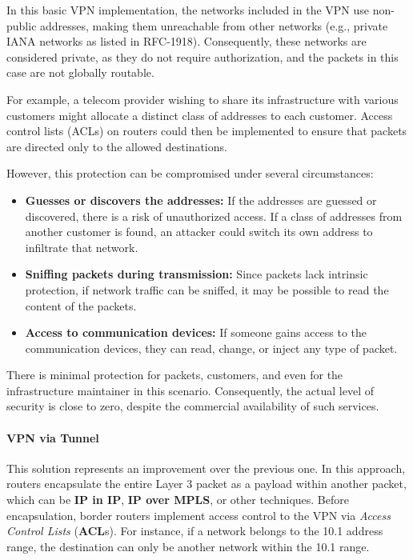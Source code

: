 In this basic VPN implementation, the networks included in the VPN use non-public addresses, making them unreachable from other networks (e.g., private IANA networks as listed in RFC-1918). Consequently, these networks are considered private, as they do not require authorization, and the packets in this case are not globally routable.

For example, a telecom provider wishing to share its infrastructure with various customers might allocate a distinct class of addresses to each customer. Access control lists (ACLs) on routers could then be implemented to ensure that packets are directed only to the allowed destinations.

However, this protection can be compromised under several circumstances:
\begin{itemize}
    \item \textbf{Guesses or discovers the addresses:} If the addresses are guessed or discovered, there is a risk of unauthorized access. If a class of addresses from another customer is found, an attacker could switch its own address to infiltrate that network.
    \item \textbf{Sniffing packets during transmission:} Since packets lack intrinsic protection, if network traffic can be sniffed, it may be possible to read the content of the packets.
    \item \textbf{Access to communication devices:} If someone gains access to the communication devices, they can read, change, or inject any type of packet.
\end{itemize}

There is minimal protection for packets, customers, and even for the infrastructure maintainer in this scenario. Consequently, the actual level of security is close to zero, despite the commercial availability of such services.


\paragraph{VPN via Tunnel}


This solution represents an improvement over the previous one. In this approach, routers encapsulate the entire Layer 3 packet as a payload within another packet, which can be \textbf{IP in IP}, \textbf{IP over MPLS}, or other techniques. Before encapsulation, border routers implement access control to the VPN via \textit{Access Control Lists} (\textbf{ACL}s). For instance, if a network belongs to the 10.1 address range, the destination can only be another network within the 10.1 range.

